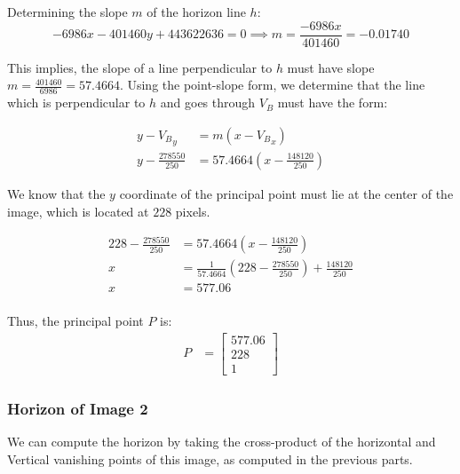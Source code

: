 \documentclass[12pt, oneside]{article}
\begin{document}
Determining the slope $m$ of the horizon line $h$: 
$$ -6986x -401460 y +  443622636 = 0  \implies m = \frac{-6986x}{401460} = -0.01740$$

This implies, the slope of a line perpendicular to $h$ must have slope $m = 
\frac{401460}{6986} = 57.4664$. Using the point-slope form, we determine that the line 
which is perpendicular to $h$ and goes through $V_B$ must have the form:

\begin{align*}
    y - {V_B}_y &= m (x - {V_B}_x)  \\
    y - \frac{278550}{250} &= 57.4664 (x - \frac{148120}{250}) 
\end{align*}

We know that the $y$ coordinate of the principal point must lie at the center 
of the image, which is located at $228$ pixels.

\begin{align*}
    228 - \frac{278550}{250} &= 57.4664 (x - \frac{148120}{250})  \\
    x &=  \frac{1}{ 57.4664}( 228 -  \frac{278550}{250}) + \frac{148120}{250}  \\
    x &=  577.06 \\
\end{align*}

Thus, the principal point $P$ is:
\begin{align*}
    P &= \begin{bmatrix}577.06 \\ 228 \\1 \end{bmatrix} 
\end{align*}






\subsubsection*{Horizon of Image 2} 

We can compute the horizon by taking the cross-product of the horizontal and Vertical
vanishing points of this image, as computed in the previous parts.
\end{document}

